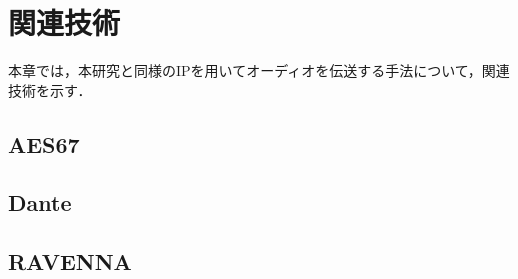 \chapter{関連技術}
\label{chap:related_works}

本章では，本研究と同様のIPを用いてオーディオを伝送する手法について，関連技術を示す．

\section{AES67}

\section{Dante}

\section{RAVENNA}
